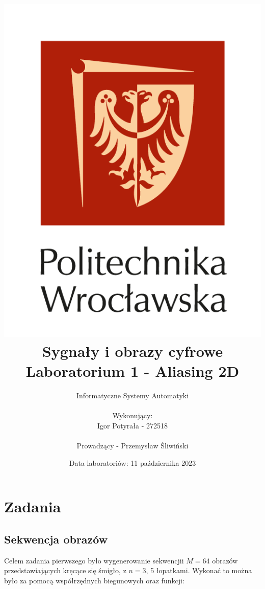 \documentclass[14pt]{article}
\title{
    \includegraphics[scale=0.5]{images/logo-pwr-pion.png}
    \vspace{1cm}
    \\
    {\textbf{
    \titlefont Sygnały i obrazy cyfrowe
    \\ Laboratorium 1 - Aliasing 2D
    }}
}
\author{
    Informatyczne Systemy Automatyki
    \\
    \\ Wykonujący:
    \\ Igor Potyrała - 272518
    \\
    \\ Prowadzący - Przemysław Śliwiński
}
\date{Data laboratoriów: 11 października 2023}
\begin{document}
\maketitle
\newpage

\section{Zadania}
\subsection{Sekwencja obrazów}
Celem zadania pierwszego było wygenerowanie sekwencjii
$M = 64$ obrazów przedstawiających kręcące się śmigło, z $n = 3$,
5 łopatkami. Wykonać to można było za pomocą współrzędnych
biegunowych oraz funkcji:
\end{document}
